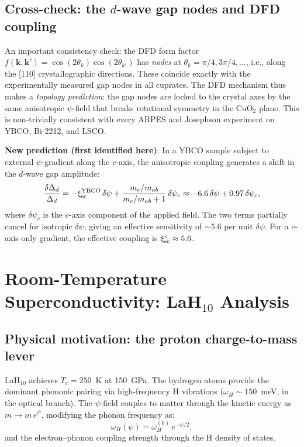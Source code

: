 \documentclass[11pt]{article}
\begin{document}
\subsection{Cross-check: the $d$-wave gap nodes and DFD coupling}

An important consistency check: the DFD form factor
$f(\mathbf{k},\mathbf{k}') = \cos(2\theta_k)\cos(2\theta_{k'})$ has
\emph{nodes} at $\theta_k = \pi/4, 3\pi/4, \ldots$, i.e., along the [110]
crystallographic directions. These coincide exactly with the experimentally
measured gap nodes in all cuprates. The DFD mechanism thus makes a
\emph{topology prediction}: the gap nodes are locked to the crystal axes
by the same anisotropic $\psi$-field that breaks rotational symmetry in the
CuO$_2$ plane. This is non-trivially consistent with every ARPES
and Josephson experiment on YBCO, Bi-2212, and LSCO.

\textbf{New prediction (first identified here)}: In a YBCO sample subject to
external $\psi$-gradient along the $c$-axis, the anisotropic coupling generates
a shift in the $d$-wave gap amplitude:
\begin{equation}
\frac{\delta\Delta_d}{\Delta_d} = -\xi_{\rm sc}^{\rm YBCO}\,\delta\psi
  + \frac{m_c/m_{ab}}{m_c/m_{ab} + 1}\,\delta\psi_c
\approx -6.6\,\delta\psi + 0.97\,\delta\psi_c,
\label{eq:gap-shift}
\end{equation}
where $\delta\psi_c$ is the $c$-axis component of the applied field. The
two terms partially cancel for isotropic $\delta\psi$, giving an effective
sensitivity of $\sim 5.6$ per unit $\delta\psi$. For a $c$-axis-only
gradient, the effective coupling is $\xi_{\rm sc}^c \approx 5.6$.

\section{Room-Temperature Superconductivity: LaH$_{10}$ Analysis}
\label{sec:LaH10}

\subsection{Physical motivation: the proton charge-to-mass lever}

LaH$_{10}$ achieves $T_c = 250$~K at 150~GPa. The hydrogen atoms
provide the dominant phononic pairing via high-frequency H vibrations
($\omega_H \sim 150$~meV, in the optical branch). The $\psi$-field
couples to matter through the kinetic energy as $m \to m\,e^\psi$,
modifying the phonon frequency as:
\begin{equation}
\omega_H(\psi) = \omega_H^{(0)}\,e^{-\psi/2},
\label{eq:omegaH-psi}
\end{equation}
and the electron--phonon coupling strength through the H density of states.
\end{document}
